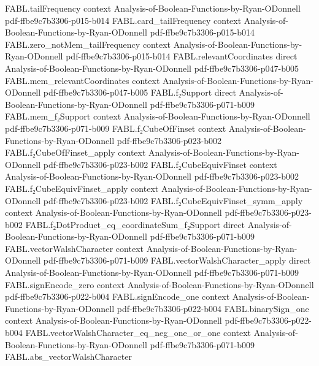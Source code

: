 \begin{theorem}
\proofstep
  {FABL.tailFrequency}
  {context}
  {Analysis-of-Boolean-Functions-by-Ryan-ODonnell}
  {pdf-ffbe9c7b3306-p015-b014}
\proofstep
  {FABL.card_tailFrequency}
  {context}
  {Analysis-of-Boolean-Functions-by-Ryan-ODonnell}
  {pdf-ffbe9c7b3306-p015-b014}
\proofstep
  {FABL.zero_notMem_tailFrequency}
  {context}
  {Analysis-of-Boolean-Functions-by-Ryan-ODonnell}
  {pdf-ffbe9c7b3306-p015-b014}
\proofstep
  {FABL.relevantCoordinates}
  {direct}
  {Analysis-of-Boolean-Functions-by-Ryan-ODonnell}
  {pdf-ffbe9c7b3306-p047-b005}
\proofstep
  {FABL.mem_relevantCoordinates}
  {context}
  {Analysis-of-Boolean-Functions-by-Ryan-ODonnell}
  {pdf-ffbe9c7b3306-p047-b005}
\proofstep
  {FABL.f₂Support}
  {direct}
  {Analysis-of-Boolean-Functions-by-Ryan-ODonnell}
  {pdf-ffbe9c7b3306-p071-b009}
\proofstep
  {FABL.mem_f₂Support}
  {context}
  {Analysis-of-Boolean-Functions-by-Ryan-ODonnell}
  {pdf-ffbe9c7b3306-p071-b009}
\proofstep
  {FABL.f₂CubeOfFinset}
  {context}
  {Analysis-of-Boolean-Functions-by-Ryan-ODonnell}
  {pdf-ffbe9c7b3306-p023-b002}
\proofstep
  {FABL.f₂CubeOfFinset_apply}
  {context}
  {Analysis-of-Boolean-Functions-by-Ryan-ODonnell}
  {pdf-ffbe9c7b3306-p023-b002}
\proofstep
  {FABL.f₂CubeEquivFinset}
  {context}
  {Analysis-of-Boolean-Functions-by-Ryan-ODonnell}
  {pdf-ffbe9c7b3306-p023-b002}
\proofstep
  {FABL.f₂CubeEquivFinset_apply}
  {context}
  {Analysis-of-Boolean-Functions-by-Ryan-ODonnell}
  {pdf-ffbe9c7b3306-p023-b002}
\proofstep
  {FABL.f₂CubeEquivFinset_symm_apply}
  {context}
  {Analysis-of-Boolean-Functions-by-Ryan-ODonnell}
  {pdf-ffbe9c7b3306-p023-b002}
\proofstep
  {FABL.f₂DotProduct_eq_coordinateSum_f₂Support}
  {direct}
  {Analysis-of-Boolean-Functions-by-Ryan-ODonnell}
  {pdf-ffbe9c7b3306-p071-b009}
\proofstep
  {FABL.vectorWalshCharacter}
  {context}
  {Analysis-of-Boolean-Functions-by-Ryan-ODonnell}
  {pdf-ffbe9c7b3306-p071-b009}
\proofstep
  {FABL.vectorWalshCharacter_apply}
  {direct}
  {Analysis-of-Boolean-Functions-by-Ryan-ODonnell}
  {pdf-ffbe9c7b3306-p071-b009}
\proofstep
  {FABL.signEncode_zero}
  {context}
  {Analysis-of-Boolean-Functions-by-Ryan-ODonnell}
  {pdf-ffbe9c7b3306-p022-b004}
\proofstep
  {FABL.signEncode_one}
  {context}
  {Analysis-of-Boolean-Functions-by-Ryan-ODonnell}
  {pdf-ffbe9c7b3306-p022-b004}
\proofstep
  {FABL.binarySign_one}
  {context}
  {Analysis-of-Boolean-Functions-by-Ryan-ODonnell}
  {pdf-ffbe9c7b3306-p022-b004}
\proofstep
  {FABL.vectorWalshCharacter_eq_neg_one_or_one}
  {context}
  {Analysis-of-Boolean-Functions-by-Ryan-ODonnell}
  {pdf-ffbe9c7b3306-p071-b009}
\proofstep
  {FABL.abs_vectorWalshCharacter}

\end{theorem}

